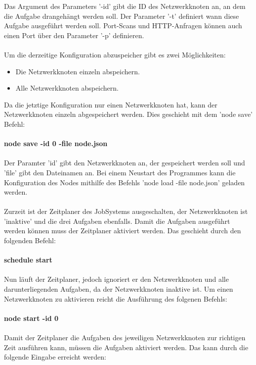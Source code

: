 \documentclass[12pt,a4paper]{report}
\begin{document}
Das Argument des Parameters '-id' gibt die ID des Netzwerkknoten an, an dem die Aufgabe drangehängt werden soll. Der Parameter '-t' definiert wann diese Aufgabe ausgeführt werden soll. Port-Scans und HTTP-Anfragen können auch einen Port über den Parameter '-p' definieren.\\\\

Um die derzeitige Konfiguration abzuspeicher gibt es zwei Möglichkeiten:

\begin{itemize}
\item Die Netzwerkknoten einzeln abspeichern.
\item Alle Netzwerkknoten abspeichern.
\end{itemize}

Da die jetztige Konfiguration nur einen Netzwerkknoten hat, kann der Netzwerkknoten einzeln abgespeichert werden. Dies geschieht mit dem 'node save' Befehl:\\\\
\textbf{node save -id 0 -file node.json}\\\\
Der Paramter 'id' gibt den Netzwerkknoten an, der gespeichert werden soll und 'file' gibt den Dateinamen an. Bei einem Neustart des Programmes kann die Konfiguration des Nodes mithilfe des Befehls 'node load -file node.json' geladen werden.\\\\
Zurzeit ist der Zeitplaner des JobSystems ausgeschalten, der Netzwerkknoten ist 'inaktive' und die drei Aufgaben ebenfalls. Damit die Aufgaben ausgeführt werden können muss der Zeitplaner aktiviert werden. Das geschieht durch den folgenden Befehl:\\\\
\textbf{schedule start}\\\\
Nun läuft der Zeitplaner, jedoch ignoriert er den Netzwerkknoten und alle darunterliegenden Aufgaben, da der Netzwerkknoten inaktive ist. Um einen Netzwerkknoten zu aktivieren reicht die Ausführung des folgenen Befehls:\\\\
\textbf{node start -id 0}\\\\
Damit der Zeitplaner die Aufgaben des jeweiligen Netzwerkknoten zur richtigen Zeit ausführen kann, müssen die Aufgaben aktiviert werden. Das kann durch die folgende Eingabe erreicht werden:\\\\
\end{document}

